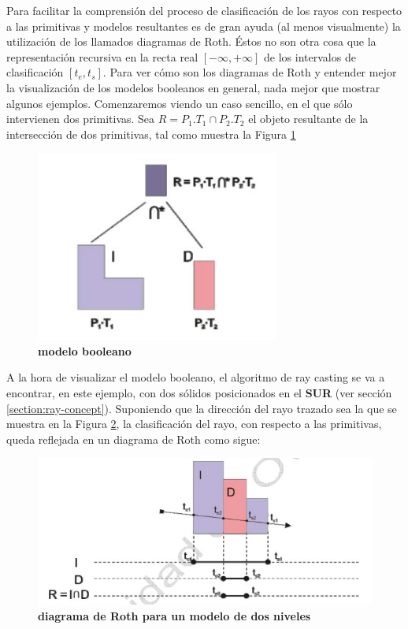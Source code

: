 Para facilitar la comprensión del proceso de clasificación de los rayos con respecto a las primitivas y modelos resultantes es de gran ayuda (al menos visualmente) la utilización de los llamados diagramas de Roth. Éstos no son otra cosa que la representación recursiva en la recta real $[−\infty, +\infty]$ de los intervalos de clasificación $[t_e, t_s]$.
Para ver cómo son los diagramas de Roth y entender mejor la visualización de los modelos booleanos en general, nada mejor que mostrar algunos ejemplos. Comenzaremos viendo un caso sencillo, en el que sólo intervienen dos primitivas.
Sea $R = P_1.T_1 \cap P_2.T_2$ el objeto resultante de la intersección de dos primitivas, tal como muestra la Figura \ref{fig:visual0}

\begin{figure}[h]
\includegraphics[width=8cm]{Img/GEO/visual0.jpg}
\centering
\caption{\textbf{\footnotesize{modelo booleano}}}
\label{fig:visual0}
\end{figure}

A la hora de visualizar el modelo booleano, el algoritmo de ray casting se va a encontrar, en este ejemplo, con dos sólidos posicionados en el \textbf{SUR} (ver sección \ref{section:ray-concept}). Suponiendo que la dirección del rayo trazado sea la que se muestra en la Figura \ref{fig:visual1}, la clasificación del rayo, con respecto a las primitivas, queda reflejada en un diagrama de Roth como sigue:

\begin{figure}[h]
\includegraphics[width=14cm]{Img/GEO/visual1.jpg}
\centering
\caption{\textbf{\footnotesize{diagrama de Roth para un modelo de dos niveles}}}
\label{fig:visual1}
\end{figure}

